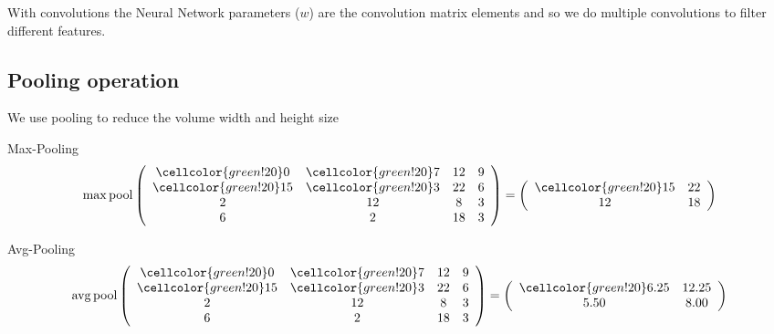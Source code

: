 \begin{frame}
    With convolutions the Neural Network parameters ($w$) are the convolution matrix elements
    and so we do multiple convolutions to filter different features.
    
\end{frame}

\subsection{Pooling operation}
\begin{frame}{\insertsubsec}
    We use pooling to reduce the volume width and height size
    \begin{block}{Max-Pooling}
        \begin{align*}
            \operatorname{max\,pool}
            \left(
            \begin{array}{cccc}
                \cellcolor{green!20} 0 & \cellcolor{green!20} 7 & 12 &  9 \\
                \cellcolor{green!20}15 & \cellcolor{green!20} 3 & 22 &  6 \\
                 2 & 12 &  8 &  3 \\
                 6 &  2 & 18 &  3 \\
            \end{array}
            \right)
            =
            \left(
            \begin{array}{cc}
                \cellcolor{green!20}15 & 22 \\
                12 & 18
            \end{array}
            \right)
        \end{align*}
    \end{block}

    \begin{block}{Avg-Pooling}
        \begin{align*}
            \operatorname{avg\,pool}
            \left(
            \begin{array}{cccc}
                \cellcolor{green!20} 0 & \cellcolor{green!20} 7 & 12 &  9 \\
                \cellcolor{green!20}15 & \cellcolor{green!20} 3 & 22 &  6 \\
                 2 & 12 &  8 &  3 \\
                 6 &  2 & 18 &  3 \\
            \end{array}
            \right)
            =
            \left(
            \begin{array}{cc}
                \cellcolor{green!20}6.25 & 12.25 \\
                5.50 & 8.00
            \end{array}
            \right)
        \end{align*}
    \end{block}
\end{frame}

